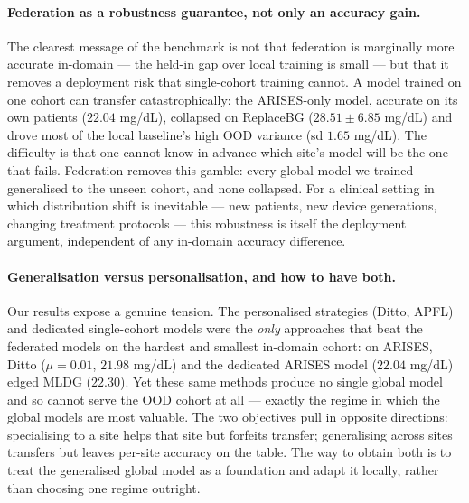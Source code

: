 \documentclass[10pt,letterpaper]{article}
\begin{document}
\paragraph{Federation as a robustness guarantee, not only an accuracy gain.} The
clearest message of the benchmark is not that federation is marginally more
accurate in-domain --- the held-in gap over local training is small --- but that
it removes a deployment risk that single-cohort training cannot. A model trained
on one cohort can transfer catastrophically: the ARISES-only model, accurate on
its own patients ($22.04$ mg/dL), collapsed on ReplaceBG ($28.51 \pm 6.85$ mg/dL)
and drove most of the local baseline's high OOD variance (sd $1.65$ mg/dL). The
difficulty is that one cannot know in advance which site's model will be the one
that fails. Federation removes this gamble: every global model we trained
generalised to the unseen cohort, and none collapsed. For a clinical setting in
which distribution shift is inevitable --- new patients, new device generations,
changing treatment protocols --- this robustness is itself the deployment
argument, independent of any in-domain accuracy difference.

\paragraph{Generalisation versus personalisation, and how to have both.} Our
results expose a genuine tension. The personalised strategies (Ditto, APFL) and
dedicated single-cohort models were the \emph{only} approaches that beat the
federated models on the hardest and smallest in-domain cohort: on ARISES, Ditto
($\mu{=}0.01$, $21.98$ mg/dL) and the dedicated ARISES model ($22.04$ mg/dL) edged
MLDG ($22.30$). Yet these same methods produce no single global model and so
cannot serve the OOD cohort at all --- exactly the regime in which the global
models are most valuable. The two objectives pull in opposite directions:
specialising to a site helps that site but forfeits transfer; generalising across
sites transfers but leaves per-site accuracy on the table. The way to obtain both
is to treat the generalised global model as a foundation and adapt it locally,
rather than choosing one regime outright.
\end{document}

